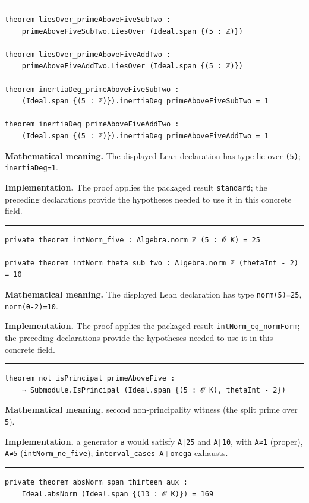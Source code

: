 \documentclass[UTF8,a4paper,11pt,fontset=fandol]{ctexart}
\theoremstyle{definition}
\newcommand{\statementsep}{\par\medskip\hrule\medskip}
\begin{document}
\statementsep
\begin{verbatim}
theorem liesOver_primeAboveFiveSubTwo :
    primeAboveFiveSubTwo.LiesOver (Ideal.span {(5 : ℤ)})

theorem liesOver_primeAboveFiveAddTwo :
    primeAboveFiveAddTwo.LiesOver (Ideal.span {(5 : ℤ)})

theorem inertiaDeg_primeAboveFiveSubTwo :
    (Ideal.span {(5 : ℤ)}).inertiaDeg primeAboveFiveSubTwo = 1

theorem inertiaDeg_primeAboveFiveAddTwo :
    (Ideal.span {(5 : ℤ)}).inertiaDeg primeAboveFiveAddTwo = 1
\end{verbatim}
\noindent\textbf{Mathematical meaning.} The displayed Lean declaration has type lie over \texttt{(5)}; \texttt{inertiaDeg=1}.\par
\noindent\textbf{Implementation.} The proof applies the packaged result \texttt{standard}; the preceding declarations provide the hypotheses needed to use it in this concrete field.\par
\statementsep
\begin{verbatim}
private theorem intNorm_five : Algebra.norm ℤ (5 : 𝓞 K) = 25

private theorem intNorm_theta_sub_two : Algebra.norm ℤ (thetaInt - 2) = 10
\end{verbatim}
\noindent\textbf{Mathematical meaning.} The displayed Lean declaration has type \texttt{norm(5)=25}, \texttt{norm(θ-2)=10}.\par
\noindent\textbf{Implementation.} The proof applies the packaged result \texttt{intNorm\_\allowbreak{}eq\_\allowbreak{}normForm}; the preceding declarations provide the hypotheses needed to use it in this concrete field.\par
\statementsep
\begin{verbatim}
theorem not_isPrincipal_primeAboveFive :
    ¬ Submodule.IsPrincipal (Ideal.span {(5 : 𝓞 K), thetaInt - 2})
\end{verbatim}
\noindent\textbf{Mathematical meaning.} second non-principality witness (the split prime over \texttt{5}).\par
\noindent\textbf{Implementation.} a generator \texttt{a} would satisfy \texttt{A∣25} and \texttt{A∣10}, with \texttt{A≠1} (proper), \texttt{A≠5} (\texttt{intNorm\_\allowbreak{}ne\_\allowbreak{}five}); \texttt{interval\_\allowbreak{}cases A}+\texttt{omega} exhausts.\par
\statementsep
\begin{verbatim}
private theorem absNorm_span_thirteen_aux :
    Ideal.absNorm (Ideal.span {(13 : 𝓞 K)}) = 169
\end{verbatim}
\end{document}
